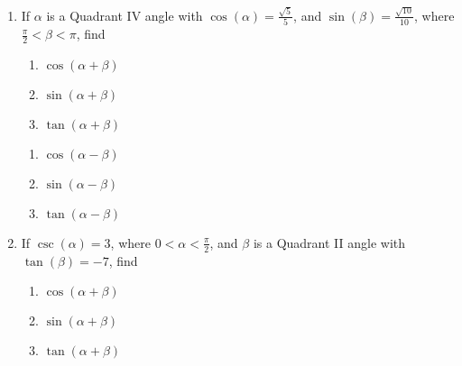 \documentclass{ximera}
\begin{document}
\begin{enumerate}

\setcounter{enumi}{\value{HW}}

\item  If $\alpha$ is a Quadrant IV angle with $\cos(\alpha) = \frac{\sqrt{5}}{5}$, and  $\sin(\beta) = \frac{\sqrt{10}}{10}$, where $\frac{\pi}{2} < \beta < \pi$, find

\begin{multicols}{3}

\begin{enumerate}

\item  $\cos(\alpha + \beta)$
\item  $\sin(\alpha + \beta)$
\item  $\tan(\alpha + \beta)$

\setcounter{HWindent}{\value{enumii}}

\end{enumerate}

\end{multicols}

\begin{multicols}{3}

\begin{enumerate}

\setcounter{enumii}{\value{HWindent}}

\item  $\cos(\alpha - \beta)$
\item  $\sin(\alpha - \beta)$
\item  $\tan(\alpha - \beta)$

\end{enumerate}

\end{multicols}

\item  If $\csc(\alpha) = 3$, where $0 < \alpha < \frac{\pi}{2}$, and $\beta$ is a Quadrant II angle with $\tan(\beta) = -7$, find

\begin{multicols}{3}

\begin{enumerate}

\item  $\cos(\alpha + \beta)$
\item  $\sin(\alpha + \beta)$
\item  $\tan(\alpha + \beta)$

\setcounter{HWindent}{\value{enumii}}


\end{enumerate}
\end{multicols}
\end{enumerate}
\end{document}
